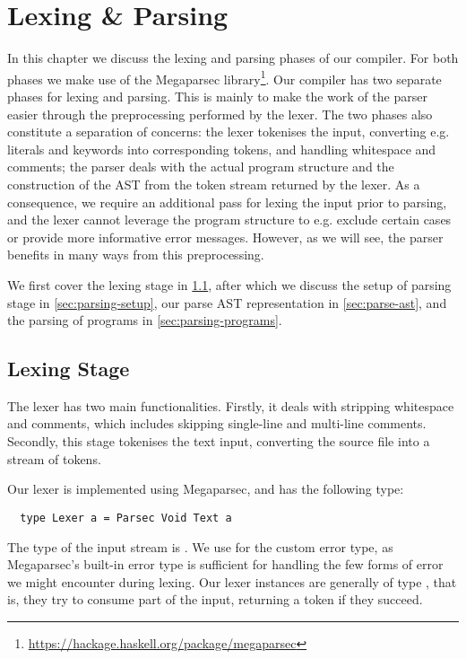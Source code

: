 \chapter{Lexing \& Parsing} \label{chp:lexing-parsing}

In this chapter we discuss the lexing and parsing phases of our compiler.
For both phases we make use of the Megaparsec
library\footnote{\url{https://hackage.haskell.org/package/megaparsec}}.
%
Our compiler has two separate phases for lexing and parsing.
This is mainly to make the work of the parser easier through the preprocessing
performed by the lexer.
The two phases also constitute a separation of concerns: the lexer
tokenises the input, converting e.g. literals and keywords into corresponding
tokens, and handling whitespace and comments; the parser deals with the actual
program structure and the construction of the AST from the token stream returned
by the lexer.
%
As a consequence, we require an additional pass for lexing the input prior to
parsing, and the lexer cannot leverage the program structure to e.g. exclude
certain cases or provide more informative error messages.
However, as we will see, the parser benefits in many ways from this
preprocessing.

We first cover the lexing stage in \cref{sec:lexing}, after which we discuss
the setup of parsing stage in \cref{sec:parsing-setup}, our parse AST
representation in \cref{sec:parse-ast}, and the parsing of programs in
\cref{sec:parsing-programs}.


\section{Lexing Stage} \label{sec:lexing}

The lexer has two main functionalities.
Firstly, it deals with stripping whitespace and comments, which includes
skipping single-line and multi-line comments.
Secondly, this stage tokenises the text input, converting the source file into a
stream of tokens.

Our lexer is implemented using Megaparsec, and has the following type:
\begin{verbatim}
  type Lexer a = Parsec Void Text a
\end{verbatim}
%
The type of the input stream is . We use  for the
custom error type, as Megaparsec's built-in error type is sufficient for
handling the few forms of error we might encounter during lexing.
%
Our lexer instances are generally of type , that is, they
try to consume part of the input, returning a token if they succeed.


